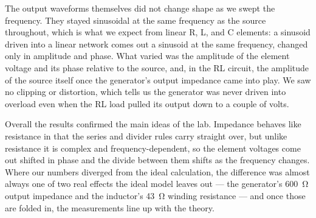\documentclass[11pt]{article}
\begin{document}
The output waveforms themselves did not change shape as we swept the frequency.
They stayed sinusoidal at the same frequency as the source throughout, which is
what we expect from linear R, L, and C elements: a sinusoid driven into a linear
network comes out a sinusoid at the same frequency, changed only in amplitude and
phase. What varied was the amplitude of the element voltage and its phase
relative to the source, and, in the RL circuit, the amplitude of the source
itself once the generator's output impedance came into play. We saw no clipping
or distortion, which tells us the generator was never driven into overload even
when the RL load pulled its output down to a couple of volts.

Overall the results confirmed the main ideas of the lab. Impedance behaves like
resistance in that the series and divider rules carry straight over, but unlike
resistance it is complex and frequency-dependent, so the element voltages come out
shifted in phase and the divide between them shifts as the frequency changes.
Where our numbers diverged from the ideal calculation, the difference was almost
always one of two real effects the ideal model leaves out --- the generator's
\SI{600}{\ohm} output impedance and the inductor's \SI{43}{\ohm} winding
resistance --- and once those are folded in, the measurements line up with the
theory.

\end{document}
